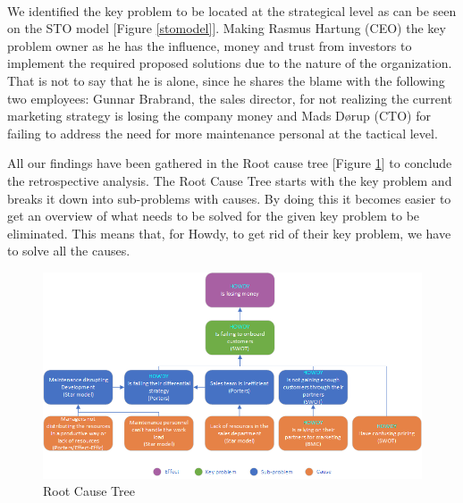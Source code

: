 \paragraph{}

We identified the key problem to be located at the strategical level as can be seen on the STO model [Figure \ref{stomodel}]. Making Rasmus Hartung (CEO) the key problem owner as he has the influence, money and trust from investors to implement the required proposed solutions due to the nature of the organization. That is not to say that he is alone, since he shares the blame with the following two employees: Gunnar Brabrand, the sales director, for not realizing the current marketing strategy is losing the company money and Mads Dørup (CTO) for failing to address the need for more maintenance personal at the tactical level.\newline


\noindent All our findings have been gathered in the Root cause tree [Figure \ref{rootcausetree}] to conclude the retrospective analysis. The Root Cause Tree starts with the key problem and breaks it down into sub-problems with causes. By doing this it becomes easier to get an overview of what needs to be solved for the given key problem to be eliminated. This means that, for Howdy, to get rid of their key problem, we have to solve all the causes. 

\begin{figure}[H]
\centering
\includegraphics[scale=0.73]{figures/rootcause.png}
\caption{Root Cause Tree}
\label{rootcausetree}
\end{figure}
